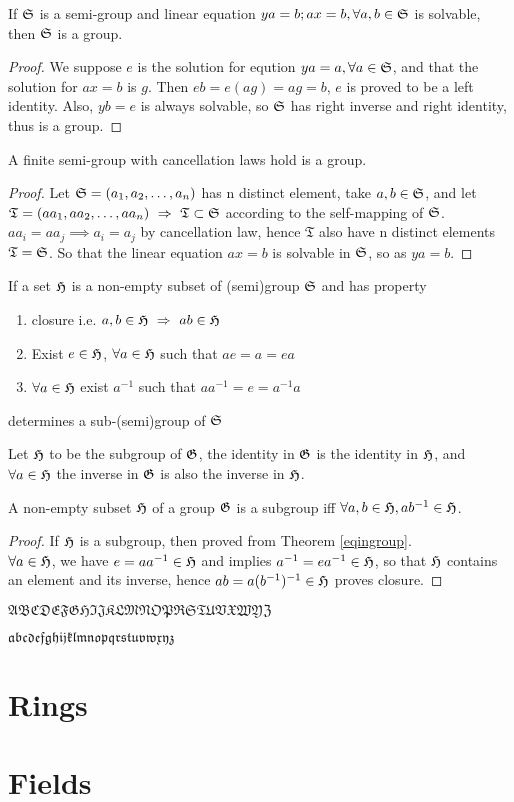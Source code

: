		\begin{theorem}
		If $\mathfrak{S}$ is a semi-group and linear equation $ya=b; ax=b, \forall a,b\in\mathfrak{S}$ is solvable, then $\mathfrak{S}$ is a group.
		\end{theorem}
		\begin{proof}
		We suppose $e$ is the solution for eqution $ya=a, \forall a\in\mathfrak{S}$, and that the solution for $ax=b$ is $g$. Then $eb=e(ag)=ag=b$, $e$ is proved to be a left identity. Also, $yb=e$ is always solvable, so $\mathfrak{S}$ has right inverse and right identity, thus is a group. 
		\end{proof}
		\begin{theorem}
		A finite semi-group with cancellation laws hold is a group.
		\end{theorem}
		\begin{proof}
		Let $\mathfrak{S}=(a_1, a_2,\dots,a_n)$ has n distinct element, take $a,b\in\mathfrak{S}$, and let $\mathfrak{T}=(aa_1, aa_2,\dots,aa_n)\hbox{$\textrm{ }\Rightarrow\textrm{ }$} \mathfrak{T}\subset\mathfrak{S}$ according to the self-mapping of $\mathfrak{S}$. $aa_i=aa_j\implies a_i=a_j$ by cancellation law, hence $\mathfrak{T}$ also have n distinct elements \implies $\mathfrak{T}=\mathfrak{S}$. So that the linear equation $ax=b$ is solvable in $\mathfrak{S}$, so as $ya=b$.
		\end{proof}
		\begin{definition}
		If a set $\mathfrak{H}$ is a non-empty subset of (semi)group $\mathfrak{S}$ and has property
		\begin{enumerate}
		\item closure i.e. $a,b\in\mathfrak{H}\hbox{$\textrm{ }\Rightarrow\textrm{ }$} ab\in\mathfrak{H}$
		\item Exist $e\in\mathfrak{H}$, $\forall a\in\mathfrak{H}$ such that $ae=a=ea$
		\item $\forall a\in\mathfrak{H}$ exist $a^{-1}$ such that $aa^{-1}=e=a^{-1}a$
		\end{enumerate}
		determines a sub-(semi)group of $\mathfrak{S}$
		\end{definition}
		\begin{theorem}\label{sub-id-inv}
		Let $\mathfrak{H}$ to be the subgroup of $\mathfrak{G}$, the identity in $\mathfrak{G}$ is the identity in $\mathfrak{H}$, and $\forall a\in\mathfrak{H}$ the inverse in $\mathfrak{G}$ is also the inverse in $\mathfrak{H}$.
		\end{theorem}
		\begin{theorem}
		A non-empty subset $\mathfrak{H}$ of a group $\mathfrak{G}$ is a subgroup iff $\forall a,b\in\mathfrak{H}, ab^{-1}\in\mathfrak{H}$.
		\end{theorem}
		\begin{proof}
		If $\mathfrak{H}$ is a subgroup, then proved from Theorem \ref{eqingroup}. \\
		$\forall a\in\mathfrak{H}$, we have $e=aa^{-1}\in\mathfrak{H}$ and implies $a^{-1}=ea^{-1}\in\mathfrak{H}$, so that $\mathfrak{H}$ contains an element and its inverse, hence $ab=a(b^{-1})^{-1}\in\mathfrak{H}$ proves closure.
		\end{proof}
		
	$\mathfrak{ABCDEFGHIJKLMNOPRSTUVXWYZ}$
	
	$\mathfrak{abcdefghijklmnopqrstuvwxyz}$
	\section{Rings}
	\section{Fields}
	
